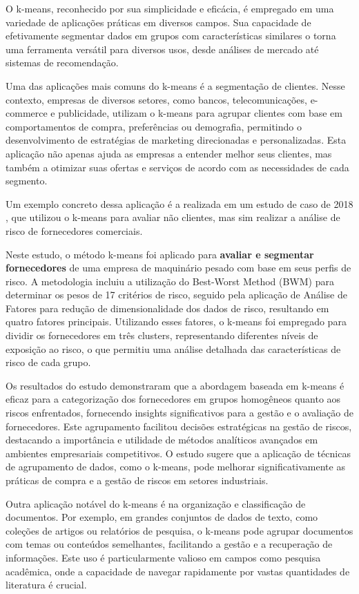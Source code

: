 \documentclass[12pt,
openright, 
oneside, %
a4paper,    %
brazil]{facom-ufu-abntex2}
\begin{document}
O k-means, reconhecido por sua simplicidade e eficácia, é empregado em uma variedade de aplicações práticas em diversos campos. Sua capacidade de efetivamente segmentar dados em grupos com características similares o torna uma ferramenta versátil para diversos usos, desde análises de mercado até sistemas de recomendação.

Uma das aplicações mais comuns do k-means é a segmentação de clientes. Nesse contexto, empresas de diversos setores, como bancos, telecomunicações, e-commerce e publicidade, utilizam o k-means para agrupar clientes com base em comportamentos de compra, preferências ou demografia, permitindo o desenvolvimento de estratégias de marketing direcionadas e personalizadas. Esta aplicação não apenas ajuda as empresas a entender melhor seus clientes, mas também a otimizar suas ofertas e serviços de acordo com as necessidades de cada segmento.

Um exemplo concreto dessa aplicação é a realizada em um estudo de caso de 2018 \cite{kMeansSupplierRiskAss2018}, que utilizou o k-means para avaliar não clientes, mas sim realizar a análise de risco de fornecedores comerciais.

Neste estudo, o método k-means foi aplicado para \textbf{avaliar e segmentar fornecedores} de uma empresa de maquinário pesado com base em seus perfis de risco. A metodologia incluiu a utilização do Best-Worst Method (BWM) para determinar os pesos de 17 critérios de risco, seguido pela aplicação de Análise de Fatores para redução de dimensionalidade dos dados de risco, resultando em quatro fatores principais. Utilizando esses fatores, o k-means foi empregado para dividir os fornecedores em três clusters, representando diferentes níveis de exposição ao risco, o que permitiu uma análise detalhada das características de risco de cada grupo.

Os resultados do estudo demonstraram que a abordagem baseada em k-means é eficaz para a categorização dos fornecedores em grupos homogêneos quanto aos riscos enfrentados, fornecendo insights significativos para a gestão e o avaliação de fornecedores. Este agrupamento facilitou decisões estratégicas na gestão de riscos, destacando a importância e utilidade de métodos analíticos avançados em ambientes empresariais competitivos. O estudo sugere que a aplicação de técnicas de agrupamento de dados, como o k-means, pode melhorar significativamente as práticas de compra e a gestão de riscos em setores industriais.

Outra aplicação notável do k-means é na organização e classificação de documentos. Por exemplo, em grandes conjuntos de dados de texto, como coleções de artigos ou relatórios de pesquisa, o k-means pode agrupar documentos com temas ou conteúdos semelhantes, facilitando a gestão e a recuperação de informações. Este uso é particularmente valioso em campos como pesquisa acadêmica, onde a capacidade de navegar rapidamente por vastas quantidades de literatura é crucial.
\end{document}
